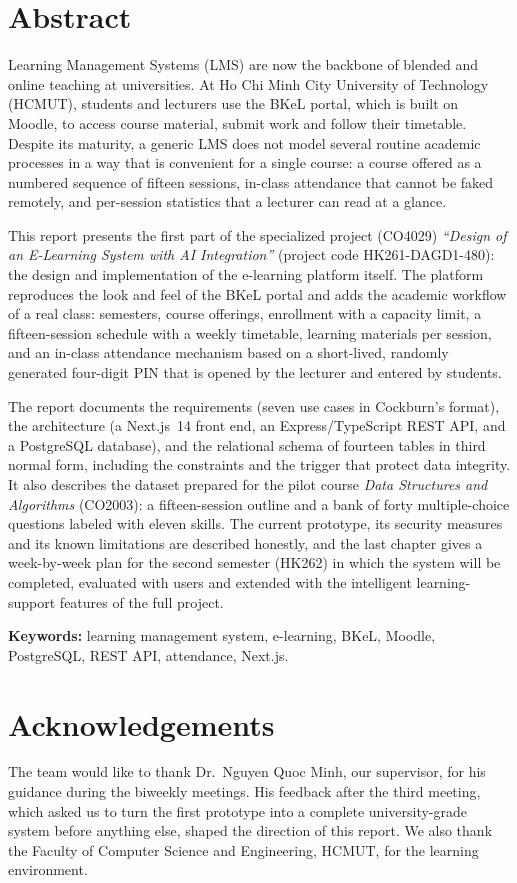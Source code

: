 \section*{Abstract}

Learning Management Systems (LMS) are now the backbone of blended and online teaching at universities. At Ho Chi Minh City University of Technology (HCMUT), students and lecturers use the BKeL portal, which is built on Moodle, to access course material, submit work and follow their timetable. Despite its maturity, a generic LMS does not model several routine academic processes in a way that is convenient for a single course: a course offered as a numbered sequence of fifteen sessions, in-class attendance that cannot be faked remotely, and per-session statistics that a lecturer can read at a glance.

This report presents the first part of the specialized project (CO4029) \emph{``Design of an E-Learning System with AI Integration''} (project code HK261-DAGD1-480): the design and implementation of the e-learning platform itself. The platform reproduces the look and feel of the BKeL portal and adds the academic workflow of a real class: semesters, course offerings, enrollment with a capacity limit, a fifteen-session schedule with a weekly timetable, learning materials per session, and an in-class attendance mechanism based on a short-lived, randomly generated four-digit PIN that is opened by the lecturer and entered by students.

The report documents the requirements (seven use cases in Cockburn's format), the architecture (a Next.js~14 front end, an Express/TypeScript REST API, and a PostgreSQL database), and the relational schema of fourteen tables in third normal form, including the constraints and the trigger that protect data integrity. It also describes the dataset prepared for the pilot course \emph{Data Structures and Algorithms} (CO2003): a fifteen-session outline and a bank of forty multiple-choice questions labeled with eleven skills. The current prototype, its security measures and its known limitations are described honestly, and the last chapter gives a week-by-week plan for the second semester (HK262) in which the system will be completed, evaluated with users and extended with the intelligent learning-support features of the full project.

\bigskip
\noindent\textbf{Keywords:} learning management system, e-learning, BKeL, Moodle, PostgreSQL, REST API, attendance, Next.js.

\section*{Acknowledgements}

The team would like to thank Dr.\ Nguyen Quoc Minh, our supervisor, for his guidance during the biweekly meetings. His feedback after the third meeting, which asked us to turn the first prototype into a complete university-grade system before anything else, shaped the direction of this report. We also thank the Faculty of Computer Science and Engineering, HCMUT, for the learning environment.


